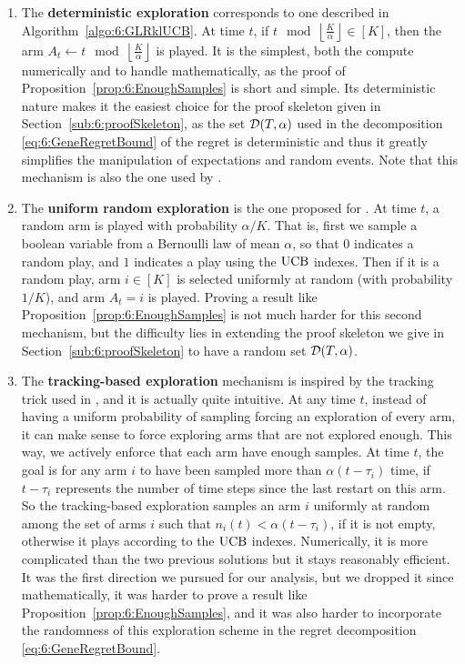 \begin{enumerate}%
    \item
    The \textbf{deterministic exploration}
    corresponds to one described in Algorithm~\ref{algo:6:GLRklUCB}.
    At time $t$, if $t \mod \left\lfloor \frac{K}{\alpha}\right\rfloor \in [K]$, then the arm $A_t \leftarrow t \mod \left\lfloor \frac{K}{\alpha}\right\rfloor$ is played.
    It is the simplest, both the compute numerically and to handle mathematically, as the proof of Proposition~\ref{prop:6:EnoughSamples} is short and simple.
    Its deterministic nature makes it the easiest choice for the proof skeleton given in Section~\ref{sub:6:proofSkeleton}, as the set $\mathcal{D}(T,\alpha)$ used in the decomposition \eqref{eq:6:GeneRegretBound} of the regret is deterministic and thus it greatly simplifies the manipulation of expectations and random events.
    Note that this mechanism is also the one used by \MUCB{} \cite{CaoZhenKvetonXie18}.

    \item
    The \textbf{uniform random exploration} is the one proposed for \CUSUMUCB{} \cite{LiuLeeShroff17}.
    At time $t$, a random arm is played with probability $\alpha/K$. That is, first we sample a boolean variable from a Bernoulli law of mean $\alpha$, so that $0$ indicates a random play, and $1$ indicates a play using the $\mathrm{UCB}$ indexes. Then if it is a random play, arm $i\in[K]$ is selected uniformly at random (with probability $1/K$), and arm $A_t = i$ is played.
    Proving a result like Proposition~\ref{prop:6:EnoughSamples} is not much harder for this second mechanism,
    but the difficulty lies in extending the proof skeleton we give in Section~\ref{sub:6:proofSkeleton} to have a random set $\mathcal{D}(T,\alpha)$.

    \item
    The \textbf{tracking-based exploration} mechanism is inspired by the tracking trick used in \cite{Garivier16BAI}, and it is actually quite intuitive.
    At any time $t$, instead of having a uniform probability of sampling forcing an exploration of every arm, it can make sense to force exploring arms that are not explored enough. This way, we actively enforce that each arm have enough samples.
    At time $t$, the goal is for any arm $i$ to have been sampled more than $\alpha (t - \tau_i)$ time, if $t - \tau_i$ represents the number of time steps since the last restart on this arm.
    So the tracking-based exploration samples an arm $i$ uniformly at random among the set of arms $i$ such that $n_i(t) < \alpha (t - \tau_i)$, if it is not empty, otherwise it plays according to the $\mathrm{UCB}$ indexes.
    Numerically, it is more complicated than the two previous solutions but it stays reasonably efficient.
    It was the first direction we pursued for our analysis, but we dropped it since mathematically, it was harder to prove a result like Proposition~\ref{prop:6:EnoughSamples}, and it was also harder to incorporate the randomness of this exploration scheme in the regret decomposition \eqref{eq:6:GeneRegretBound}.
\end{enumerate}

